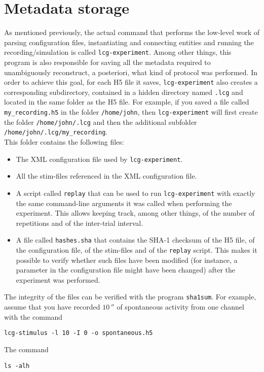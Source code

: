 \section{Metadata storage} \label{sec:metadata}
As mentioned previously, the actual command that performs the
low-level work of parsing configuration files, instantiating and
connecting entities and running the recording/simulation is called
\verb+lcg-experiment+. Among other things, this program is also
responsible for saving all the metadata required to
unambiguously reconstruct, a posteriori, what kind of protocol was
performed. In order to achieve this goal, for each H5 file it saves,
\verb+lcg-experiment+ also creates a corresponding subdirectory,
contained in a hidden directory named \verb+.lcg+ and located in the
same folder as the H5 file. For example, if you saved a file called
\verb+my_recording.h5+ in the folder
\verb+/home/john+, then \verb+lcg-experiment+ will
first create the folder \verb+/home/john/.lcg+ and
then the additional subfolder
\verb+/home/john/.lcg/my_recording+. \\
This folder contains the following files:
\begin{itemize}
\item The XML configuration file used by \verb+lcg-experiment+.
\item All the stim-files referenced in the XML configuration file.
\item A script called \verb+replay+ that can be used to run
  \verb+lcg-experiment+ with exactly the same command-line arguments
  it was called when performing the experiment. This allows keeping
  track, among other things, of the number of repetitions and of the
  inter-trial interval.
\item A file called \verb+hashes.sha+ that contains the SHA-1 checksum
  of the H5 file, of the configuration file, of the stim-files and of
  the \verb+replay+ script. This makes it possible to verify whether
  such files have been modified (for instance, a parameter in the
  configuration file might have been changed) after the experiment was
  performed.
\end{itemize}
The integrity of the files can be verified with the program
\verb+sha1sum+. For example, assume that you have recorded
$10\,\second$ of spontaneous activity from one channel with the
command
\begin{lstlisting}
lcg-stimulus -l 10 -I 0 -o spontaneous.h5
\end{lstlisting}
The command
\begin{lstlisting}
ls -alh
\end{lstlisting}
